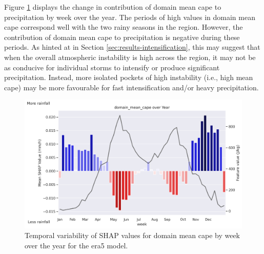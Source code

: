 Figure \ref{fig:obs_precipitation_era5_shap_domain_mean_cape_by_week_over_year} displays the change in contribution of domain mean \acrshort{cape} to precipitation by week over the year. The periods of high values in domain mean \acrshort{cape} correspond well with the two rainy seasons in the region. However, the contribution of domain mean \acrshort{cape} to precipitation is negative during these periods. As hinted at in Section \ref{sec:results-intensification}, this may suggest that when the overall atmospheric instability is high across the region, it may not be as conducive for individual storms to intensify or produce significant precipitation. Instead, more isolated pockets of high instability (i.e., high mean \acrshort{cape}) may be more favourable for fast intensification and/or heavy precipitation.

\begin{figure}[ht]
    \centering
    \includegraphics[width=\textwidth]{../figures/generated/experiments/obs_precipitation/temporal_corr/obs_precipitation_era5_shap_domain_mean_cape_by_week_over_year.png}
    \caption{Temporal variability of SHAP values for domain mean \acrshort{cape} by week over the year for the \acrshort{era5} model.}
    \label{fig:obs_precipitation_era5_shap_domain_mean_cape_by_week_over_year}
\end{figure}

